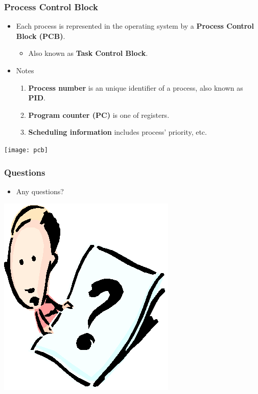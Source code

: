\documentclass[CJKutf8,xcolor=pdftex,dvipsnames,table]{beamer}
\begin{document}
\begin{CJK*}{UTF8}{song}
  \begin{frame}
  \frametitle{Process Control Block} \pause
  \begin{minipage}[c]{0.6\textwidth}
    \begin{itemize}
    \item{Each process is represented in the operating system by a \textbf{Process Control Block (PCB)}.} \pause
      \begin{itemize}
      \item{Also known as \textbf{Task Control Block}.} \pause
      \end{itemize}
    \item{Notes} \pause
      \begin{enumerate}
      \item{\textbf{Process number} is an unique identifier of a process, also known as \textbf{PID}.} \pause
      \item{\textbf{Program counter (PC)} is one of registers.} \pause
      \item{\textbf{Scheduling information} includes process' priority, etc.} \pause
      \end{enumerate}
    \end{itemize}
  \end{minipage}%
  \begin{minipage}[c]{0.4\textwidth}
    \centering
    \texttt{[image: pcb]}
  \end{minipage}
  \end{frame}

  \begin{frame}
  \frametitle{Questions}
  \begin{itemize}
  \item{Any questions?}
  \end{itemize}
  \begin{center}
    \includegraphics[scale=.5]{question}
  \end{center}
  \end{frame}


\end{CJK*}
\end{document}
